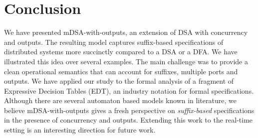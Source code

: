 \section{Conclusion}

We have presented mDSA-with-outputs, an extension of DSA with concurrency and outputs. The resulting model captures suffix-based specifications of distributed systems more succinctly compared to a DSA or a DFA. We have illustrated this idea over several examples. The main challenge was to provide a clean operational semantics that can account for suffixes, multiple ports and outputs. We have applied our study to the formal analysis of a fragment of Expressive Decision Tables (EDT), an industry notation for formal specifications. Although there are several automaton based models known in literature, we believe mDSA-with-outputs gives a fresh perspective on \emph{suffix-based} specifications in the presence of concurrency and outputs. Extending this work to the real-time setting is an interesting direction for future work. 
